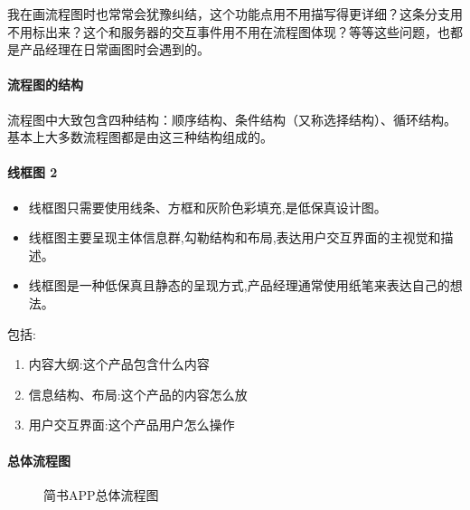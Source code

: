 \documentclass[letterpaper,11pt,english]{sphinxmanual}
\begin{document}
我在画流程图时也常常会犹豫纠结，这个功能点用不用描写得更详细？这条分支用不用标出来？这个和服务器的交互事件用不用在流程图体现？等等这些问题，也都是产品经理在日常画图时会遇到的。


\paragraph{流程图的结构}
\label{\detokenize{chapter_knowledge/flow_chart:id15}}
流程图中大致包含四种结构：顺序结构、条件结构（又称选择结构）、循环结构。基本上大多数流程图都是由这三种结构组成的。


\paragraph{线框图 2\sphinxfootnotemark[510]}
\label{\detokenize{chapter_knowledge/flow_chart:id16}}%
\begin{footnotetext}[510]\sphinxAtStartFootnote
{}
%
\end{footnotetext}\ignorespaces \begin{itemize}
\item {} 
线框图只需要使用线条、方框和灰阶色彩填充,是低保真设计图。

\item {} 
线框图主要呈现主体信息群,勾勒结构和布局,表达用户交互界面的主视觉和描述。

\item {} 
线框图是一种低保真且静态的呈现方式,产品经理通常使用纸笔来表达自己的想法。

\end{itemize}

包括:
\begin{enumerate}
%
\item {} 
内容大纲:这个产品包含什么内容

\item {} 
信息结构、布局:这个产品的内容怎么放

\item {} 
用户交互界面:这个产品用户怎么操作

\end{enumerate}


\paragraph{总体流程图}
\label{\detokenize{chapter_knowledge/flow_chart:id17}}
\begin{figure}[H]
\centering
\capstart

\noindent{}
\caption{简书APP总体流程图\sphinxfootnotemark[511]}\label{\detokenize{chapter_knowledge/flow_chart:id39}}\end{figure}
%
\begin{footnotetext}[511]\sphinxAtStartFootnote
{}
%
\end{footnotetext}\ignorespaces 
\end{document}
